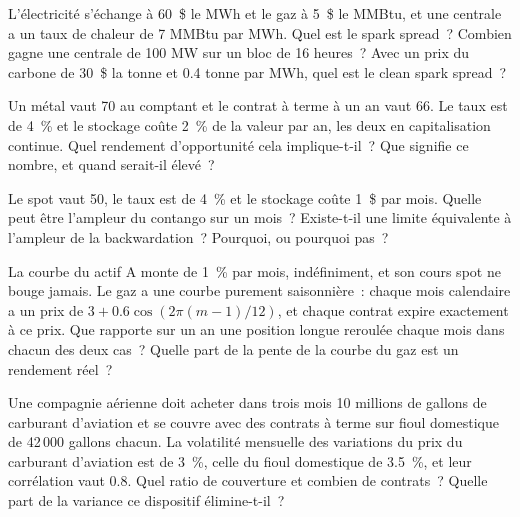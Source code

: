 \begin{question}\label{iq:iv2:commodities-and-energy:5}
L'électricité s'échange à 60~\$ le MWh et le gaz à 5~\$ le MMBtu, et une centrale a un taux de chaleur de 7 MMBtu par MWh. Quel est le spark spread~? Combien gagne une centrale de 100 MW sur un bloc de 16 heures~? Avec un prix du carbone de 30~\$ la tonne et 0.4 tonne par MWh, quel est le clean spark spread~?
\end{question}

\begin{question}\label{iq:iv2:commodities-and-energy:6}
Un métal vaut 70 au comptant et le contrat à terme à un an vaut 66. Le taux est de 4~\% et le stockage coûte 2~\% de la valeur par an, les deux en capitalisation continue. Quel rendement d'opportunité cela implique-t-il~? Que signifie ce nombre, et quand serait-il élevé~?
\end{question}

\begin{question}\label{iq:iv2:commodities-and-energy:7}
Le spot vaut 50, le taux est de 4~\% et le stockage coûte 1~\$ par mois. Quelle peut être l'ampleur du contango sur un mois~? Existe-t-il une limite équivalente à l'ampleur de la backwardation~? Pourquoi, ou pourquoi pas~?
\end{question}

\begin{question}\label{iq:iv2:commodities-and-energy:8}
La courbe du actif A monte de 1~\% par mois, indéfiniment, et son cours spot ne bouge jamais. Le gaz a une courbe purement saisonnière~: chaque mois calendaire a un prix de $3 + 0.6\cos(2\pi(m - 1)/12)$, et chaque contrat expire exactement à ce prix. Que rapporte sur un an une position longue reroulée chaque mois dans chacun des deux cas~? Quelle part de la pente de la courbe du gaz est un rendement réel~?
\end{question}

\begin{question}\label{iq:iv2:commodities-and-energy:9}
Une compagnie aérienne doit acheter dans trois mois 10 millions de gallons de carburant d'aviation et se couvre avec des contrats à terme sur fioul domestique de 42\,000 gallons chacun. La volatilité mensuelle des variations du prix du carburant d'aviation est de 3~\%, celle du fioul domestique de 3.5~\%, et leur corrélation vaut 0.8. Quel ratio de couverture et combien de contrats~? Quelle part de la variance ce dispositif élimine-t-il~?
\end{question}

